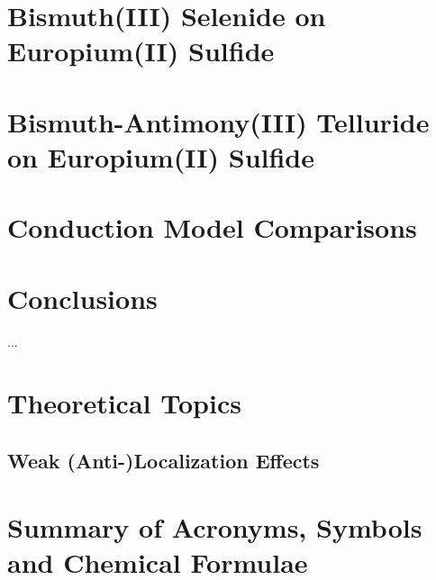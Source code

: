 \documentclass{report}
\begin{document}
\chapter{Bismuth(III) Selenide on Europium(II) Sulfide}\label{ch:bilayer2014}
\begin{refsection} 
    
    \printbibliography[heading=subbibintoc, title=References for Chapter~\ref{ch:bilayer2014}]
\end{refsection} 

\chapter{Bismuth-Antimony(III) Telluride on Europium(II) Sulfide}\label{ch:bilayer2018}
\begin{refsection}
    
    \printbibliography[heading=subbibintoc, title=References for Chapter~\ref{ch:bilayer2018}]
\end{refsection}

\chapter{Conduction Model Comparisons}\label{ch:models}
\begin{refsection} 
    
    \printbibliography[heading=subbibintoc, title=References for Chapter~\ref{ch:models}]
\end{refsection}

\chapter{Conclusions}
\label{ch:conclusions}
     ...
\appendix
%

\chapter{Theoretical Topics}\label{ch:theory}
\begin{refsection} 
    \section{Weak (Anti-)Localization Effects}\label{sec:wl}
    
    \printbibliography[heading=subbibintoc, title=References for Appendix~\ref{ch:theory}]
\end{refsection}
%
\chapter{Summary of Acronyms, Symbols and Chemical Formulae}
    
\end{document}
